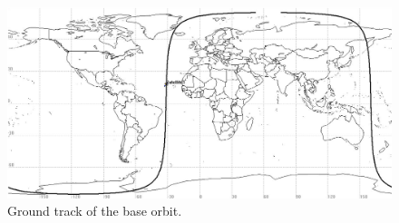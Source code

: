 \begin{figure}[h!]
\centering
\includegraphics[width=0.95\textheight, angle=90]{chapters/img/finalTrack.jpg}
\caption{Ground track of the base orbit.}
\label{fig:finalTrack}
\end{figure}  